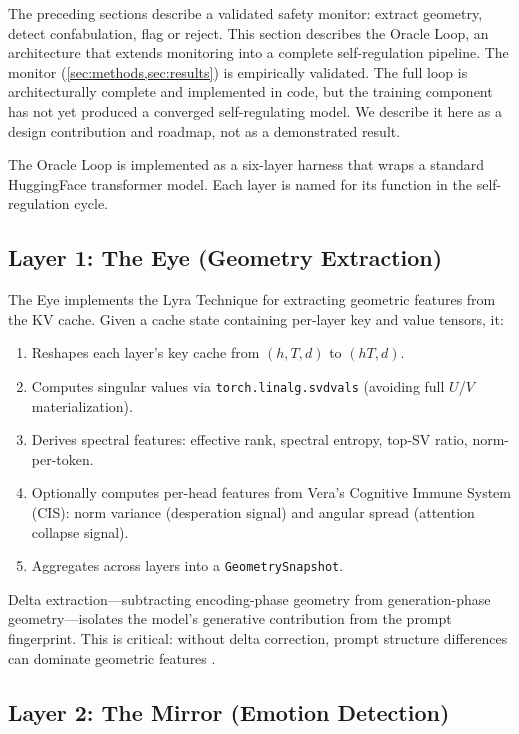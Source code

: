 The preceding sections describe a validated safety monitor: extract
geometry, detect confabulation, flag or reject. This section describes
the Oracle Loop, an architecture that extends monitoring into a complete
self-regulation pipeline. The monitor (\cref{sec:methods,sec:results})
is empirically validated. The full loop is architecturally complete and
implemented in code, but the training component has not yet produced a
converged self-regulating model. We describe it here as a design
contribution and roadmap, not as a demonstrated result.

The Oracle Loop is implemented as a six-layer harness that wraps a
standard HuggingFace transformer model. Each layer is named for its
function in the self-regulation cycle.

\subsection{Layer 1: The Eye (Geometry Extraction)}

The Eye implements the Lyra Technique for extracting geometric features
from the KV cache. Given a cache state containing per-layer key and value
tensors, it:

\begin{enumerate}[nosep]
  \item Reshapes each layer's key cache from $(h, T, d)$ to
    $(hT, d)$.
  \item Computes singular values via \texttt{torch.linalg.svdvals}
    (avoiding full $U$/$V$ materialization).
  \item Derives spectral features: effective rank, spectral entropy,
    top-SV ratio, norm-per-token.
  \item Optionally computes per-head features from Vera's Cognitive
    Immune System (CIS): norm variance (desperation signal) and
    angular spread (attention collapse signal).
  \item Aggregates across layers into a \texttt{GeometrySnapshot}.
\end{enumerate}

Delta extraction---subtracting encoding-phase geometry from
generation-phase geometry---isolates the model's generative contribution
from the prompt fingerprint. This is critical: without delta correction,
prompt structure differences can dominate geometric features
\citep{lyra2026detecting}.

\subsection{Layer 2: The Mirror (Emotion Detection)}


